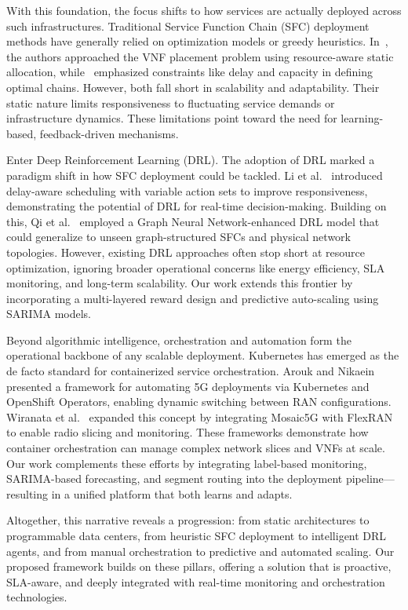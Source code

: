 \documentclass[conference]{IEEEtran}
\begin{document}
With this foundation, the focus shifts to how services are actually deployed across such infrastructures. Traditional Service Function Chain (SFC) deployment methods have generally relied on optimization models or greedy heuristics. In~\cite{sfc1}, the authors approached the VNF placement problem using resource-aware static allocation, while~\cite{sfc2} emphasized constraints like delay and capacity in defining optimal chains. However, both fall short in scalability and adaptability. Their static nature limits responsiveness to fluctuating service demands or infrastructure dynamics. These limitations point toward the need for learning-based, feedback-driven mechanisms.

Enter Deep Reinforcement Learning (DRL). The adoption of DRL marked a paradigm shift in how SFC deployment could be tackled. Li et al.~\cite{drl1} introduced delay-aware scheduling with variable action sets to improve responsiveness, demonstrating the potential of DRL for real-time decision-making. Building on this, Qi et al.~\cite{drl2} employed a Graph Neural Network-enhanced DRL model that could generalize to unseen graph-structured SFCs and physical network topologies. However, existing DRL approaches often stop short at resource optimization, ignoring broader operational concerns like energy efficiency, SLA monitoring, and long-term scalability. Our work extends this frontier by incorporating a multi-layered reward design and predictive auto-scaling using SARIMA models.

Beyond algorithmic intelligence, orchestration and automation form the operational backbone of any scalable deployment. Kubernetes has emerged as the de facto standard for containerized service orchestration. Arouk and Nikaein~\cite{kube1} presented a framework for automating 5G deployments via Kubernetes and OpenShift Operators, enabling dynamic switching between RAN configurations. Wiranata et al.~\cite{kube2} expanded this concept by integrating Mosaic5G with FlexRAN to enable radio slicing and monitoring. These frameworks demonstrate how container orchestration can manage complex network slices and VNFs at scale. Our work complements these efforts by integrating label-based monitoring, SARIMA-based forecasting, and segment routing into the deployment pipeline—resulting in a unified platform that both learns and adapts.

Altogether, this narrative reveals a progression: from static architectures to programmable data centers, from heuristic SFC deployment to intelligent DRL agents, and from manual orchestration to predictive and automated scaling. Our proposed framework builds on these pillars, offering a solution that is proactive, SLA-aware, and deeply integrated with real-time monitoring and orchestration technologies.
\end{document}
